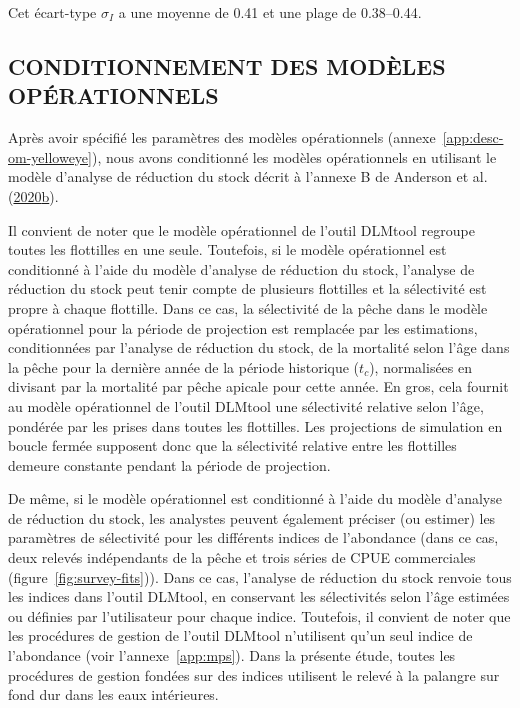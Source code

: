 \documentclass[11pt]{book}
\begin{document}
Cet écart-type \(\sigma_I\) a une moyenne de 0.41 et une plage de 0.38--0.44.

\hypertarget{sec:approach3-conditioning}{%
\subsection{CONDITIONNEMENT DES MODÈLES OPÉRATIONNELS}\label{sec:approach3-conditioning}}

Après avoir spécifié les paramètres des modèles opérationnels (annexe~\ref{app:desc-om-yelloweye}), nous avons conditionné les modèles opérationnels en utilisant le modèle d'analyse de réduction du stock décrit à l'annexe B de Anderson et al. (\protect\hyperlink{ref-anderson2020gfmp}{2020}\protect\hyperlink{ref-anderson2020gfmp}{b}).

Il convient de noter que le modèle opérationnel de l'outil DLMtool regroupe toutes les flottilles en une seule. Toutefois, si le modèle opérationnel est conditionné à l'aide du modèle d'analyse de réduction du stock, l'analyse de réduction du stock peut tenir compte de plusieurs flottilles et la sélectivité est propre à chaque flottille. Dans ce cas, la sélectivité de la pêche dans le modèle opérationnel pour la période de projection est remplacée par les estimations, conditionnées par l'analyse de réduction du stock, de la mortalité selon l'âge dans la pêche pour la dernière année de la période historique (\(t_c\)), normalisées en divisant par la mortalité par pêche apicale pour cette année. En gros, cela fournit au modèle opérationnel de l'outil DLMtool une sélectivité relative selon l'âge, pondérée par les prises dans toutes les flottilles. Les projections de simulation en boucle fermée supposent donc que la sélectivité relative entre les flottilles demeure constante pendant la période de projection.

De même, si le modèle opérationnel est conditionné à l'aide du modèle d'analyse de réduction du stock, les analystes peuvent également préciser (ou estimer) les paramètres de sélectivité pour les différents indices de l'abondance (dans ce cas, deux relevés indépendants de la pêche et trois séries de CPUE commerciales (figure~\ref{fig:survey-fits})). Dans ce cas, l'analyse de réduction du stock renvoie tous les indices dans l'outil DLMtool, en conservant les sélectivités selon l'âge estimées ou définies par l'utilisateur pour chaque indice. Toutefois, il convient de noter que les procédures de gestion de l'outil DLMtool n'utilisent qu'un seul indice de l'abondance (voir l'annexe~\ref{app:mps}). Dans la présente étude, toutes les procédures de gestion fondées sur des indices utilisent le relevé à la palangre sur fond dur dans les eaux intérieures.
\end{document}
